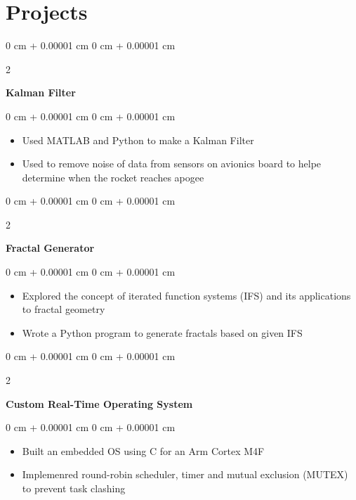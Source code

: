 \documentclass[10pt, letterpaper]{article}
\newenvironment{onecolentry}{
    \begin{adjustwidth}{
        0 cm + 0.00001 cm
    }{
        0 cm + 0.00001 cm
    }
}{
    \end{adjustwidth}
} %
\newenvironment{twocolentry}[2][]{
    \onecolentry
    \def\secondColumn{#2}
    \setcolumnwidth{\fill, 4.5 cm}
    \begin{paracol}{2}
}{
    \switchcolumn \raggedleft \secondColumn
    \end{paracol}
    \endonecolentry
} %
\begin{document}
\begin{samepage}
\begin{samepage}
        \end{samepage}

    \section{Projects}

        \begin{twocolentry}{}
            \textbf{Kalman Filter}
        \end{twocolentry}

        \vspace{0.10 cm}
        \begin{onecolentry}
            \begin{itemize}
                \item Used MATLAB and Python to make a Kalman Filter
                \item Used to remove noise of data from sensors on avionics board to helpe determine when the rocket reaches apogee
            \end{itemize}
        \end{onecolentry}


        \vspace{0.2 cm}

        \begin{twocolentry}{}
            \textbf{Fractal Generator}
        \end{twocolentry}

        \vspace{0.10 cm}
        \begin{onecolentry}
            \begin{itemize}
                \item Explored the concept of iterated function systems (IFS) and its applications to fractal geometry 
                \item Wrote a Python program to generate fractals based on given IFS
            \end{itemize}
        \end{onecolentry}


        \vspace{0.2 cm}

        \begin{twocolentry}{}
            \textbf{Custom Real-Time Operating System}
        \end{twocolentry}

        \vspace{0.10 cm}
        \begin{onecolentry}
            \begin{itemize}
                \item Built an embedded OS using C for an Arm Cortex M4F 
                \item Implemenred round-robin scheduler, timer and mutual exclusion (MUTEX) to prevent task clashing
            \end{itemize}
        \end{onecolentry}


\end{samepage}
\end{document}
